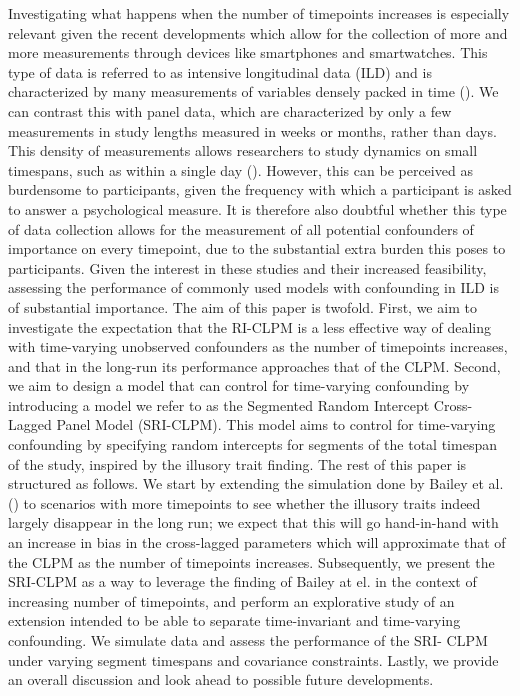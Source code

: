 \documentclass[
  man,
  floatsintext,
  longtable,
  nolmodern,
  notxfonts,
  notimes,
  colorlinks=true,linkcolor=blue,citecolor=blue,urlcolor=blue]{apa7}
\begin{document}
Investigating what happens when the number of timepoints increases is
especially relevant given the recent developments which allow for the
collection of more and more measurements through devices like
smartphones and smartwatches. This type of data is referred to as
intensive longitudinal data (ILD) and is characterized by many
measurements of variables densely packed in time
(). We can contrast this with panel data, which are
characterized by only a few measurements in study lengths measured in
weeks or months, rather than days. This density of measurements allows
researchers to study dynamics on small timespans, such as within a
single day
(). However, this can be perceived as burdensome to participants,
given the frequency with which a participant is asked to answer a
psychological measure. It is therefore also doubtful whether this type
of data collection allows for the measurement of all potential
confounders of importance on every timepoint, due to the substantial
extra burden this poses to participants. Given the interest in these
studies and their increased feasibility, assessing the performance of
commonly used models with confounding in ILD is of substantial
importance. The aim of this paper is twofold. First, we aim to
investigate the expectation that the RI-CLPM is a less effective way of
dealing with time-varying unobserved confounders as the number of
timepoints increases, and that in the long-run its performance
approaches that of the CLPM. Second, we aim to design a model that can
control for time-varying confounding by introducing a model we refer to
as the Segmented Random Intercept Cross-Lagged Panel Model (SRI-CLPM).
This model aims to control for time-varying confounding by specifying
random intercepts for segments of the total timespan of the study,
inspired by the illusory trait finding. The rest of this paper is
structured as follows. We start by extending the simulation done by
Bailey et al. () to
scenarios with more timepoints to see whether the illusory traits indeed
largely disappear in the long run; we expect that this will go
hand-in-hand with an increase in bias in the cross-lagged parameters
which will approximate that of the CLPM as the number of timepoints
increases. Subsequently, we present the SRI-CLPM as a way to leverage
the finding of Bailey at el. in the context of increasing number of
timepoints, and perform an explorative study of an extension intended to
be able to separate time-invariant and time-varying confounding. We
simulate data and assess the performance of the SRI- CLPM under varying
segment timespans and covariance constraints. Lastly, we provide an
overall discussion and look ahead to possible future developments.
\end{document}
